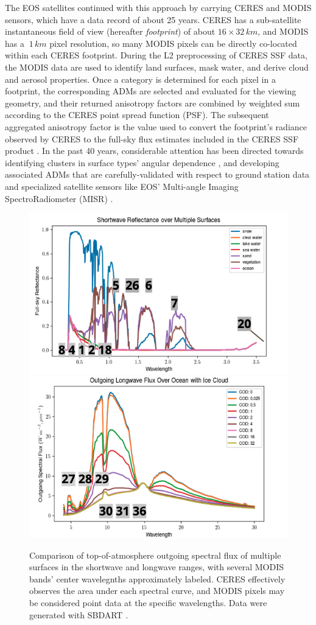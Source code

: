 \documentclass[11pt]{article}
\begin{document}
The EOS satellites continued with this approach by carrying CERES and MODIS sensors, which have a data record of about 25 years. CERES has a sub-satellite instantaneous field of view (hereafter \textit{footprint}) of about $16\times 32 \,\si{km}$, and MODIS has a $~1\,\si{km}$ pixel resolution, so many MODIS pixels can be directly co-located within each CERES footprint. During the L2 preprocessing of CERES SSF data, the MODIS data are used to identify land surfaces, mask water, and derive cloud and aerosol properties. Once a category is determined for each pixel in a footprint, the corresponding ADMs are selected and evaluated for the viewing geometry, and their returned anisotropy factors are combined by weighted sum according to the CERES point spread function (PSF). The subsequent aggregated anisotropy factor is the value used to convert the footprint's radiance observed by CERES to the full-sky flux estimates included in the CERES SSF product \cite{loeb_earths_2018}. In the past 40 years, considerable attention has been directed towards identifying clusters in surface types' angular dependence \cite{suttles_angular_1988}, and developing associated ADMs that are carefully-validated with respect to ground station data and specialized satellite sensors like EOS' Multi-angle Imaging SpectroRadiometer (MISR) \cite{loeb_defining_2002} \cite{su_next-generation_2015}.

\begin{figure}[h!]
    \centering

    \includegraphics[width=.48\linewidth]{figs/sbdart_sw.png}
    \includegraphics[width=.48\linewidth]{figs/sbdart_lw.png}

    \caption{Comparison of top-of-atmosphere outgoing spectral flux of multiple surfaces in the shortwave and longwave ranges, with several MODIS bands' center wavelegnths approximately labeled. CERES effectively observes the area under each spectral curve, and MODIS pixels may be considered point data at the specific wavelengths. Data were generated with SBDART \cite{ricchiazzi_sbdart_1998}.}
    \label{ceres_modis_compare}
\end{figure}
\end{document}
